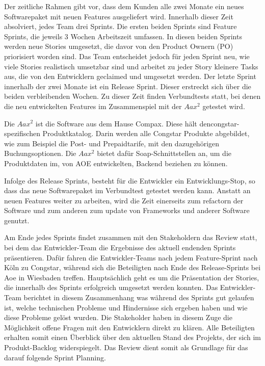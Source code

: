 \documentclass[11pt,a4paper]{article} %
\begin{document}
Der zeitliche Rahmen gibt vor, dass dem Kunden alle zwei Monate ein neues Softwarepaket mit neuen Features ausgeliefert wird. 
Innerhalb dieser Zeit absolviert, jedes Team drei Sprints. Die ersten beiden Sprints sind Feature Sprints, 
die jeweils 3 Wochen Arbeitszeit umfassen. In diesen beiden Sprints werden neue Stories umgesetzt, 
die davor von den Product Ownern (PO) priorisiert worden sind. Das Team
entscheidet jedoch für jeden Sprint neu, wie viele Stories realistisch umsetzbar sind und arbeitet zu jeder Story kleinere Tasks aus, 
die von den Entwicklern geclaimed und umgesetzt werden. Der letzte
Sprint innerhalb der zwei Monate ist ein Release Sprint.
Dieser erstreckt sich über die beiden verbleibenden Wochen. 
Zu dieser Zeit finden Verbundtests statt, bei denen die neu entwickelten Features im Zusammenspiel mit der $Aax^{2}$ getestet wird. 

Die $Aax^{2}$ ist die Software aus dem Hause Compax. Diese hält dencongstar-spezifischen Produktkatalog.
Darin werden alle Congstar Produkte abgebildet, wie zum Beispiel die Post- und
Prepaidtarife, mit den dazugehörigen Buchungsoptionen.
Die $Aax^{2}$ bietet dafür Soap-Schnittstellen an, um die Produktdaten im, von
AOE entwickelten, Backend beziehen zu können.

Infolge des Release Sprints, besteht für die Entwickler ein Entwicklungs-Stop, 
so dass das neue Softwarepaket im Verbundtest getestet werden kann. Anstatt an neuen Features weiter zu arbeiten, 
wird die Zeit einerseits zum refactorn der Software und zum anderen zum update von Frameworks und anderer Software genutzt.

Am Ende jedes Sprints findet zusammen mit den Stakeholdern das Review statt, 
bei dem das Entwickler-Team die Ergebnisse des aktuell endenden Sprints
präsentieren.
Dafür fahren die Entwickler-Teams nach jedem Feature-Sprint nach Köln zu
Congstar, während sich die Beteiligten nach Ende des Release-Sprints bei Aoe in
Wiesbaden treffen.
Hauptsächlich geht es um die Präsentation der Stories, die innerhalb des
Sprints erfolgreich umgesetzt werden konnten.
Das Entwickler-Team berichtet in diesem Zusammenhang was während des Sprints gut
gelaufen ist, welche technischen Probleme und Hindernisse sich ergeben haben und
wie diese Probleme gelöst wurden. Die Stakeholder haben in diesem Zuge die
Möglichkeit offene Fragen mit den Entwicklern direkt zu klären. Alle Beteiligten
erhalten somit einen Überblick über den aktuellen Stand des Projekts, der sich
im Produkt-Backlog widerspiegelt.
Das Review dient somit als Grundlage für das darauf folgende Sprint Planning.
\end{document}
